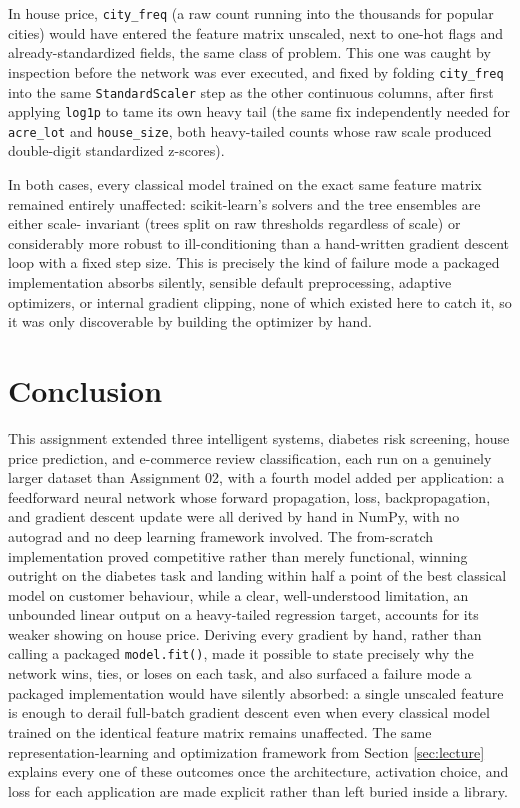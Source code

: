 \documentclass[11pt]{article}
\newcommand{\code}[1]{\texttt{#1}}
\begin{document}
In house price, \verb|city_freq| (a raw count running into the thousands for popular
cities) would have entered the feature matrix unscaled, next to one-hot flags and
already-standardized fields, the same class of problem. This one was caught by inspection
before the network was ever executed, and fixed by folding \verb|city_freq| into the same
\verb|StandardScaler| step as the other continuous columns, after first applying
\verb|log1p| to tame its own heavy tail (the same fix independently needed for
\verb|acre_lot| and \verb|house_size|, both heavy-tailed counts whose raw scale produced
double-digit standardized z-scores).

In both cases, every classical model trained on the exact same feature matrix remained
entirely unaffected: scikit-learn's solvers and the tree ensembles are either scale-
invariant (trees split on raw thresholds regardless of scale) or considerably more robust
to ill-conditioning than a hand-written gradient descent loop with a fixed step size. This
is precisely the kind of failure mode a packaged implementation absorbs silently, sensible
default preprocessing, adaptive optimizers, or internal gradient clipping, none of which
existed here to catch it, so it was only discoverable by building the optimizer by hand.

\section{Conclusion}

This assignment extended three intelligent systems, diabetes risk screening, house price
prediction, and e-commerce review classification, each run on a genuinely larger dataset
than Assignment 02, with a fourth model added per application: a feedforward neural network
whose forward propagation, loss, backpropagation, and gradient descent update were all
derived by hand in NumPy, with no autograd and no deep learning framework involved. The
from-scratch implementation proved competitive rather than merely functional, winning
outright on the diabetes task and landing within half a point of the best classical model
on customer behaviour, while a clear, well-understood limitation, an unbounded linear
output on a heavy-tailed regression target, accounts for its weaker showing on house price.
Deriving every gradient by hand, rather than calling a packaged \code{model.fit()}, made it
possible to state precisely why the network wins, ties, or loses on each task, and also
surfaced a failure mode a packaged implementation would have silently absorbed: a single
unscaled feature is enough to derail full-batch gradient descent even when every classical
model trained on the identical feature matrix remains unaffected. The same
representation-learning and optimization framework from Section \ref{sec:lecture} explains
every one of these outcomes once the architecture, activation choice, and loss for each
application are made explicit rather than left buried inside a library.
\end{document}
